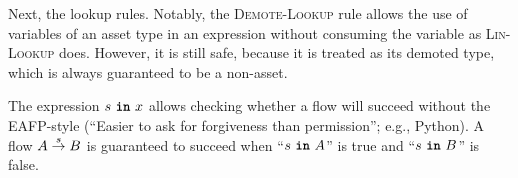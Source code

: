 \documentclass[dvipsnames, usenames, sigconf]{acmart}
\begin{document}
Next, the lookup rules.
Notably, the \textsc{Demote-Lookup} rule allows the use of variables of an asset type in an expression without consuming the variable as \textsc{Lin-Lookup} does.
However, it is still safe, because it is treated as its demoted type, which is always guaranteed to be a non-asset.

\begin{mathpar}


\end{mathpar}

The expression $s~\varin~x$ allows checking whether a flow will succeed without the EAFP-style (``Easier to ask for forgiveness than permission''; e.g., Python).
A flow $A \sends{s} B$ is guaranteed to succeed when ``$s~\varin~A$'' is true and ``$s~\varin~B$'' is false.
\begin{mathpar}
\end{mathpar}
\end{document}
